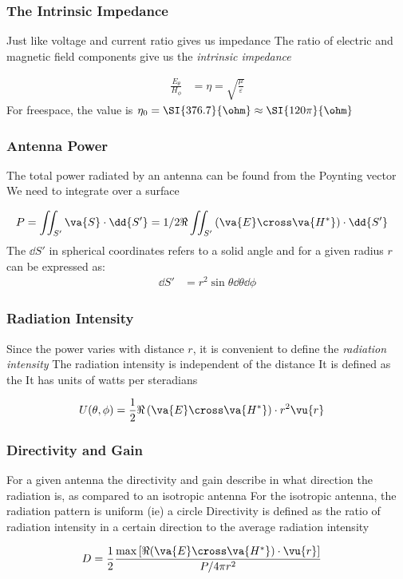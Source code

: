 \documentclass[10pt, compress]{beamer}
\newcommand{\E}{\varepsilon}  %
\renewcommand{\u}{\mu}  %
\begin{document}
\begin{frame}
  \frametitle{The Intrinsic Impedance}
  \begin{outline}
    \1 Just like voltage and current ratio gives us impedance
    \1 The ratio of electric and magnetic field components give us the \textit{intrinsic impedance}
  \end{outline}
  \begin{align*}
    \frac{E_{\theta}}{H_{\phi}} & = \eta = \sqrt{\frac{\u}{\E}}
  \end{align*}
  For freespace, the value is $\eta_0 = \SI{376.7}{\ohm} \approx \SI{120 \pi}{\ohm}$
\end{frame}


\begin{frame}
  \frametitle{Antenna Power}
  \begin{outline}
    \1 The total power radiated by an antenna can be found from the Poynting vector
    \1 We need to integrate over a surface
  \end{outline}
  \begin{align*}
    P & = \iint_{S'} \va{S} \cdot \dd{S'} = 1/2 \Re \iint_{S'} \left( \va{E} \cross \va{H^{*}}\right) \cdot \dd{S'}
  \end{align*}
  The $\dd{S'}$ in spherical coordinates refers to a solid angle and for a given radius $r$ can be expressed as:
  \begin{align*}
    \dd{S'} & = r^2 \sin \theta \dd{\theta} \dd{\phi}
  \end{align*}
\end{frame}

\begin{frame}
  \frametitle{Radiation Intensity}
  \begin{outline}
    \1 Since the power varies with distance $r$, it is convenient to define the \textit{radiation intensity}
    \1 The radiation intensity is independent of the distance
    \1 It is defined as the \color{red}{power radiated in a given direction per unit solid angle}
    \2 It has units of watts per steradians
  \end{outline}
  \begin{align*}
    U(\theta, \phi) & = \frac{1}{2} \Re \left(\va{E} \cross \va{H^{*}}\right) \cdot r^2 \vu{r}
  \end{align*}
\end{frame}

\begin{frame}
  \frametitle{Directivity and Gain}
  \begin{outline}
    \1 For a given antenna the directivity and gain describe in what direction the radiation is, as compared to an isotropic antenna
    \1 For the isotropic antenna, the radiation pattern is uniform (ie) a circle
    \1 Directivity is defined as the ratio of radiation intensity in a certain direction to the average radiation intensity
  \end{outline}
  \begin{align*}
    D & = \frac{1}{2} \frac{\max \left[\Re (\va{E} \cross \va{H^{*}}) \cdot \vu{r} \right]}{P /4 \pi r^2}
  \end{align*}
\end{frame}
\end{document}

